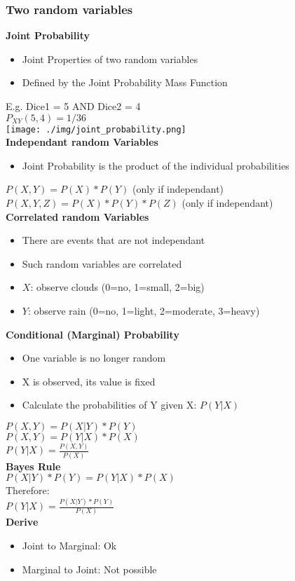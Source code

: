 \subsubsection{Two random variables}
\textbf{Joint Probability}
\begin{itemize}
    \item Joint Properties of two random variables
    \item Defined by the Joint Probability Mass Function
\end{itemize}
E.g. Dice1 = 5 AND Dice2 = 4\\
$P_{XY}(5,4) = 1/36$\\ 
\texttt{[image: ./img/joint\_probability.png]} \\
\textbf{Independant random Variables}
\begin{itemize}
    \item Joint Probability is the product of the individual probabilities
\end{itemize}
$P(X,Y) = P(X) * P(Y)$ (only if independant)\\ 
$P(X,Y,Z) = P(X) * P(Y) * P(Z)$ (only if independant)\\
\textbf{Correlated random Variables}
\begin{itemize}
    \item There are events that are not independant
    \item Such random variables are correlated
    \item $X$: observe clouds (0=no, 1=small, 2=big)
    \item $Y$: observe rain (0=no, 1=light, 2=moderate, 3=heavy)
\end{itemize}
\textbf{Conditional (Marginal) Probability}
\begin{itemize}
    \item One variable is no longer random
    \item X is observed, its value is fixed
    \item Calculate the probabilities of Y given X: $P(Y | X)$
\end{itemize}
$P(X, Y) = P(X | Y) * P(Y)$\\ 
$P(X, Y) = P(Y | X) * P(X)$\\
$P(Y | X) = \frac{P(X,Y)}{P(X)}$\\ 
\textbf{Bayes Rule}\\
$P(X|Y)*P(Y) = P(Y|X)*P(X)$\\ 
Therefore:\\
$P(Y|X) = \frac{P(X|Y)*P(Y)}{P(X)}$\\ 
\textbf{Derive}
\begin{itemize}
    \item Joint to Marginal: Ok
    \item Marginal to Joint: Not possible
\end{itemize}